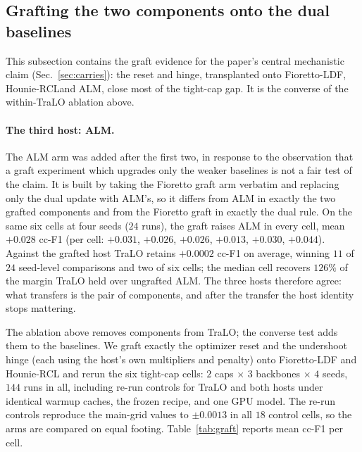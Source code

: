 \documentclass[10pt]{article}
\begin{document}


\subsection{Grafting the two components onto the dual baselines}
\label{app:graft}

This subsection contains the graft evidence for the paper's central
mechanistic claim (Sec.~\ref{sec:carries}): the reset and hinge,
transplanted onto Fioretto-LDF{,} Hounie-RCL{and ALM},
close most of the
tight-cap gap. It is the converse of the within-TraLO ablation above.

{\paragraph{The third host: ALM.}
The ALM arm was added after the first two, in response to the observation that a
graft experiment which upgrades only the weaker baselines is not a fair test of
the claim. It is built by taking the Fioretto graft arm verbatim and replacing
only the dual update with ALM's, so it differs from ALM in exactly the two
grafted components and from the Fioretto graft in exactly the dual rule. On the
same six cells at four seeds ($24$ runs), the graft raises ALM in every cell,
mean $+0.028$ cc-F1 (per cell: $+0.031$, $+0.026$, $+0.026$, $+0.013$, $+0.030$,
$+0.044$). Against the grafted host TraLO retains $+0.0002$ cc-F1 on average,
winning $11$ of $24$ seed-level comparisons and two of six cells; the median cell
recovers $126\%$ of the margin TraLO held over ungrafted ALM. The three hosts
therefore agree: what transfers is the pair of components, and after the transfer
the host identity stops mattering.}

The ablation above removes components from TraLO; the converse test adds
them to the baselines. We graft exactly the optimizer reset and the
undershoot hinge (each using the host's own multipliers and penalty)
onto Fioretto-LDF and Hounie-RCL and rerun the six tight-cap cells:
$2$ caps $\times$ $3$ backbones $\times$ $4$ seeds, $144$ runs in all,
including re-run controls for TraLO and both hosts under identical
warmup caches, the frozen recipe, and one GPU model. The re-run
controls reproduce the main-grid values to $\pm0.0013$ in all $18$
control cells, so the arms are compared on equal footing.
Table~\ref{tab:graft} reports mean cc-F1 per cell.
\end{document}
